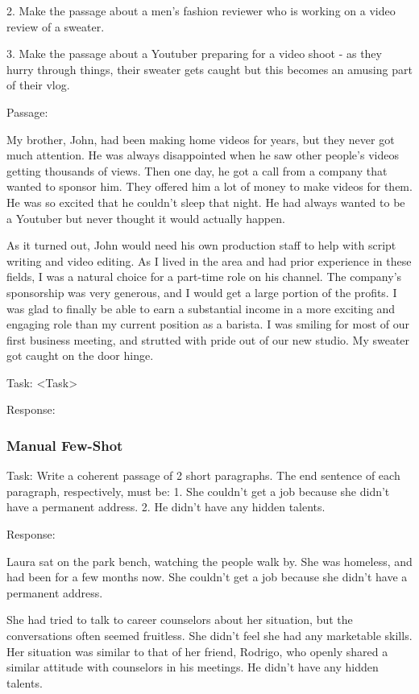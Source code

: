 \documentclass[11pt]{article}
\begin{document}
2. Make the passage about a men's fashion reviewer who is working on a video review of a sweater.

3. Make the passage about a Youtuber preparing for a video shoot - as they hurry through things, their sweater gets caught but this becomes an amusing part of their vlog.

Passage:

My brother, John, had been making home videos for years, but they never got much attention. He was always disappointed when he saw other people's videos getting thousands of views. Then one day, he got a call from a company that wanted to sponsor him. They offered him a lot of money to make videos for them. He was so excited that he couldn't sleep that night. He had always wanted to be a Youtuber but never thought it would actually happen.

As it turned out, John would need his own production staff to help with script writing and video editing. As I lived in the area and had prior experience in these fields, I was a natural choice for a part-time role on his channel. The company's sponsorship was very generous, and I would get a large portion of the profits. I was glad to finally be able to earn a substantial income in a more exciting and engaging role than my current position as a barista. I was smiling for most of our first business meeting, and strutted with pride out of our new studio. My sweater got caught on the door hinge.

Task: <Task>

Response: 
  
\subsubsection*{Manual Few-Shot}

Task: Write a coherent passage of 2 short paragraphs. The end sentence of each paragraph, respectively, must be: 1. She couldn't get a job because she didn't have a permanent address. 2. He didn't have any hidden talents.

Response: 

Laura sat on the park bench, watching the people walk by. She was homeless, and had been for a few months now. She couldn't get a job because she didn't have a permanent address.

She had tried to talk to career counselors about her situation, but the conversations often seemed fruitless. She didn't feel she had any marketable skills. Her situation was similar to that of her friend, Rodrigo, who openly shared a similar attitude with counselors in his meetings. He didn't have any hidden talents.
\end{document}
